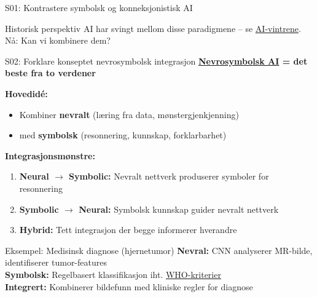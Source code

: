 \documentclass[aspectratio=169, 10pt]{beamer}
\begin{document}
\begin{frame}{S01: Kontrastere symbolsk og konneksjonistisk AI}
    \vspace{0.15cm}
    \begin{block}{Historisk perspektiv}
        AI har svingt mellom disse paradigmene -- se \href{https://en.wikipedia.org/wiki/AI_winter}{AI-vintrene}. Nå: Kan vi kombinere dem?
    \end{block}
\end{frame}

\begin{frame}{S02: Forklare konseptet nevrosymbolsk integrasjon}
    \textbf{\href{https://en.wikipedia.org/wiki/Neuro-symbolic_AI}{Nevrosymbolsk AI} = det beste fra to verdener}
    
    \vspace{0.2cm}
    \textbf{Hovedidé:}
    \begin{itemize}
        \item Kombiner \textbf{nevralt} (læring fra data, mønstergjenkjenning)
        \item med \textbf{symbolsk} (resonnering, kunnskap, forklarbarhet)
    \end{itemize}
    
    \vspace{0.2cm}
    \textbf{Integrasjonsmønstre:}
    \begin{enumerate}
        \item \textbf{Neural $\rightarrow$ Symbolic:} Nevralt nettverk produserer symboler for resonnering
        \item \textbf{Symbolic $\rightarrow$ Neural:} Symbolsk kunnskap guider nevralt nettverk
        \item \textbf{Hybrid:} Tett integrasjon der begge informerer hverandre
    \end{enumerate}
    
    \vspace{0.2cm}
    {\small
    \begin{block}{Eksempel: Medisinsk diagnose (hjernetumor)}
        \textbf{Nevral:} CNN analyserer MR-bilde, identifiserer tumor-features \\
        \textbf{Symbolsk:} Regelbasert klassifikasjon iht. \href{https://www.who.int/publications/i/item/9789240021310}{WHO-kriterier} \\
        \textbf{Integrert:} Kombinerer bildefunn med kliniske regler for diagnose
    \end{block}
    }
\end{frame}

\end{document}
